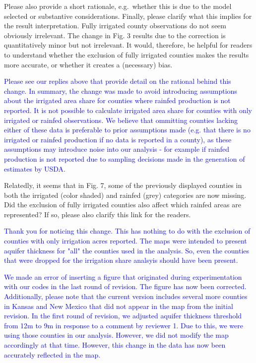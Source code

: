 \documentclass[
]{article}
\begin{document}
Please also provide a short rationale, e.g.~whether this is due to the
model selected or substantive considerations. Finally, please clarify
what this implies for the result interpretation. Fully irrigated county
observations do not seem obviously irrelevant. The change in Fig. 3
results due to the correction is quantitatively minor but not
irrelevant. It would, therefore, be helpful for readers to understand
whether the exclusion of fully irrigated counties makes the results more
accurate, or whether it creates a (necessary) bias.

\textcolor{blue}{Please see our replies above that provide detail on the rational behind this change. In summary, the change was made to avoid introducing assumptions about the irrigated area share for counties where rainfed production is not reported. It is not possible to calculate irrigated area share for counties with only irrigated or rainfed observations. We believe that ommitting counties lacking either of these data is preferable to prior assumptions made (e.g. that there is no irrigated or rainfed production if no data is reported in a county), as these assumptions may introduce noise into our analysis - for example if rainfed production is not reported due to sampling decisions made in the generation of estimates by USDA.}

Relatedly, it seems that in Fig. 7, some of the previously displayed
counties in both the irrigated (color shaded) and rainfed (grey)
categories are now missing. Did the exclusion of fully irrigated
counties also affect which rainfed areas are represented? If so, please
also clarify this link for the readers.

\textcolor{blue}{Thank you for noticing this change. This has nothing to do with the exclusion of counties with only irrigation acres reported. The maps were intended to present aquifer thickness for "all" the counties used in the analysis. So, even the counties that were dropped for the irrigation share analsyis should have been present.}

\textcolor{blue}{We made an error of inserting a figure that originated during experimentation with our codes in the last round of revision. The figure has now been corrected. Additionally, please note that the current version includes several more counties in Kansas and New Mexico that did not appear in the map from the initial revision. In the first round of revision, we adjusted aquifer thickness threshold from 12m to 9m in response to a comment by reviewer 1. Due to this, we were using those counties in our analysis. However, we did not modify the map accordingly at that time. However, this change in the data has now been accurately reflected in the map.}
\end{document}

